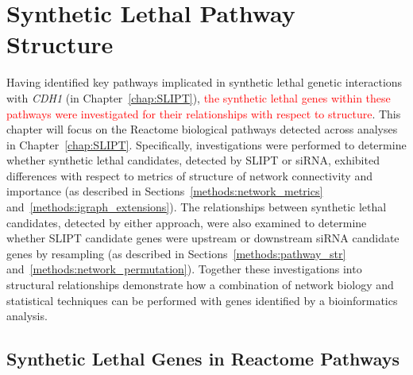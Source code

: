 \chapter{Synthetic Lethal Pathway Structure}
\label{chap:Pathways}
  
Having identified key \glspl{pathway} implicated in \gls{synthetic lethal} genetic interactions with \textit{CDH1} (in Chapter~\ref{chap:SLIPT}), \textcolor{red}{the \gls{synthetic lethal} genes within these pathways were investigated for their relationships with respect to  structure}. This chapter will focus on the Reactome biological \glspl{pathway} detected across analyses in Chapter~\ref{chap:SLIPT}. 
%
Specifically, investigations were performed to determine whether \gls{synthetic lethal} candidates, detected by \gls{SLIPT} or \gls{siRNA}, exhibited differences with respect to metrics of  structure of network connectivity and importance (as described in Sections~\ref{methods:network_metrics} and~\ref{methods:igraph_extensions}). The relationships between \gls{synthetic lethal} candidates, detected by either approach, were also examined to determine whether \gls{SLIPT} candidate genes were upstream or downstream \gls{siRNA} candidate genes %
by resampling (as described in Sections~\ref{methods:pathway_str} and~\ref{methods:network_permutation}). %
%
Together these investigations into structural relationships demonstrate how a combination of network biology and statistical techniques can be performed with genes identified by a \gls{bioinformatics} analysis.

\FloatBarrier

\section{Synthetic Lethal Genes in Reactome Pathways} \label{chapt4:SL_Genes}

\FloatBarrier

